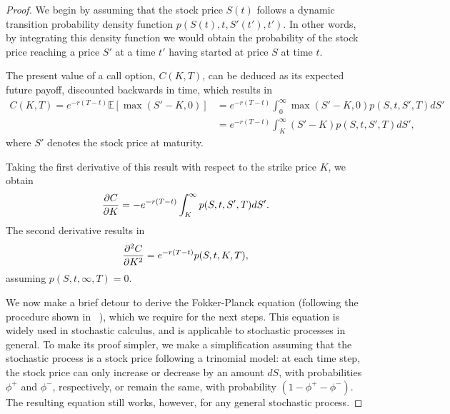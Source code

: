 \begin{proof}

We begin by assuming that the stock price $S(t)$ follows a dynamic transition probability density function $p(S(t),t,S'(t'),t')$. In other words, by integrating this density function we would obtain the probability of the stock price reaching a price $S'$ at a time $t'$ having started at price $S$ at time $t$.

The present value of a call option, $C(K,T)$, can be deduced as its expected future payoff, discounted backwards in time, which results in
\begin{equation}
\begin{split}\label{deriv0}
C(K,T)=e^{-r(T-t)}\mathbb{E}\left[\max\left(S'-K,0\right)\right]&=e^{-r(T-t)}\int_0^\infty\max\left(S'-K,0\right)p(S,t,S',T)dS'\\
&=e^{-r(T-t)}\int_K^\infty(S'-K)p(S,t,S',T)dS',
\end{split}
\end{equation}
\noindent where $S'$ denotes the stock price at maturity.

Taking the first derivative of this result with respect to the strike price $K$, we obtain
\begin{equation}\label{dcdk}
\pdv{C}{K}=-e^{-r(T-t)}\int_K^\infty p(S,t,S',T)dS'.
\end{equation}
The second derivative results in
\begin{equation}\label{d2cdk2}
\pdv{^2C}{K^2}=e^{-r(T-t)}p(S,t,K,T),
\end{equation}
\noindent assuming $p(S,t,\infty,T)=0$.

We now make a brief detour to derive the Fokker-Planck equation (following the procedure shown in ~\citep{Wilmott}), which we require for the next steps. This equation is widely used in stochastic calculus, and is applicable to stochastic processes in general.
To make its proof simpler, we make a simplification assuming that the stochastic process is a stock price following a trinomial model: at each time step, the stock price can only increase or decrease by an amount $dS$, with probabilities $\phi^+$ and $\phi^-$, respectively, or remain the same, with probability $(1-\phi^+-\phi^-)$. The resulting equation still works, however, for any general stochastic process.



\end{proof}
